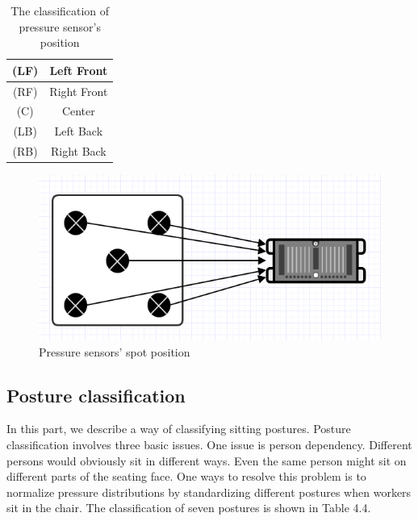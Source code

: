 \documentclass[conference]{IEEEtran}
\begin{document}
 \begin{table}[h]
{\renewcommand\arraystretch{1.25}
\caption{The classification of pressure sensor's position}
\begin{tabular}{|c|cc}  \hline\hline
(LF)& \multicolumn{2}{p{7cm}|}{\raggedright Left Front} \\ \hline
(RF)& \multicolumn{2}{p{7cm}|}{\raggedright Right Front} \\ \hline
(C)& \multicolumn{2}{p{7cm}|}{\raggedright Center} \\ \hline
(LB)& \multicolumn{2}{p{7cm}|}{\raggedright Left Back} \\ \hline
(RB)& \multicolumn{2}{p{7cm}|}{\raggedright Right Back} \\ \hline \hline
\end{tabular}}
\end{table}


\begin{figure}[H]
\begin{center}
    \includegraphics[scale=0.5]{img_08.png}
    \caption{Pressure sensors' spot position} 
\end{center}
\end{figure}

\subsection{Posture classification\\}

In this part, we describe a way of classifying sitting postures. Posture classification involves three basic issues. One issue is person dependency. Different persons would obviously sit in different ways. Even the same person might sit on different parts of the seating face. One ways to resolve this problem is to normalize pressure distributions by standardizing different postures when workers sit in the chair. The classification of seven postures is shown in Table 4.4.
\end{document}
